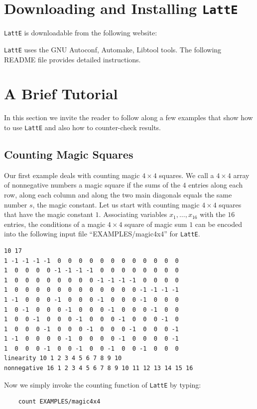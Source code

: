 \documentclass{article}
\newcommand{\latte}{{\tt LattE}\xspace}
\begin{document}

\section{Downloading and Installing {\tt LattE}}

{\tt LattE} is downloadable from the following website:



\latte uses the GNU Autoconf, Automake, Libtool tools. %
The following README file provides detailed instructions.

{\small}


\section{A Brief Tutorial}
In this section we invite the reader to follow along a few examples
that show how to use {\tt LattE} and also how to counter-check
results.

\subsection{Counting Magic Squares}
Our first example deals with counting magic $4\times 4$ squares. We 
call a $4\times 4$ array of nonnegative numbers a magic square if the
sums of the $4$ entries along each row, along each column and along
the two main diagonals equals the same number $s$, the magic
constant. Let us start with counting magic $4\times 4$ squares that
have the magic constant $1$. Associating variables $x_1,\ldots,x_{16}$ with
the $16$ entries, the conditions of a magic $4\times 4$ square of
magic sum $1$ can be encoded into the following input file
``EXAMPLES/magic4x4'' for {\tt LattE}.
\begin{verbatim}
10 17
1 -1 -1 -1 -1  0  0  0  0  0  0  0  0  0  0  0  0
1  0  0  0  0 -1 -1 -1 -1  0  0  0  0  0  0  0  0
1  0  0  0  0  0  0  0  0 -1 -1 -1 -1  0  0  0  0
1  0  0  0  0  0  0  0  0  0  0  0  0 -1 -1 -1 -1
1 -1  0  0  0 -1  0  0  0 -1  0  0  0 -1  0  0  0
1  0 -1  0  0  0 -1  0  0  0 -1  0  0  0 -1  0  0
1  0  0 -1  0  0  0 -1  0  0  0 -1  0  0  0 -1  0
1  0  0  0 -1  0  0  0 -1  0  0  0 -1  0  0  0 -1
1 -1  0  0  0  0 -1  0  0  0  0 -1  0  0  0  0 -1
1  0  0  0 -1  0  0 -1  0  0 -1  0  0 -1  0  0  0
linearity 10 1 2 3 4 5 6 7 8 9 10
nonnegative 16 1 2 3 4 5 6 7 8 9 10 11 12 13 14 15 16
\end{verbatim}
Now we simply invoke the counting function of {\tt LattE} by typing:
\begin{verbatim}
    count EXAMPLES/magic4x4
\end{verbatim}
\end{document}

